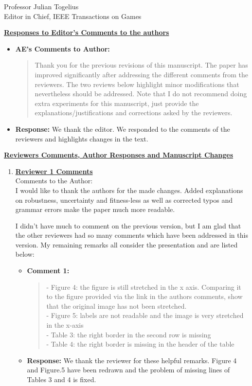 \documentclass[10pt]{letter} %
\begin{document}
\begin{letter}{Professor Julian Togelius \\ Editor in Chief, IEEE Transactions on Games}
\newpage


{\bf \underline{ Responses to Editor's  Comments to the authors}}\\
\begin{itemize}
 \item 	\bf  {\bf AE's Comments to Author:}
		\begin{quote}
Thank you for the previous revisions of this manuscript. The paper has improved significantly after addressing the different comments from the reviewers. The two reviews below highlight minor modifications that nevertheless should be addressed. Note that I do not recommend doing extra experiments for this manuscript, just provide the explanations/justifications and corrections asked by the reviewers.
		\end{quote}
 \item {\bf Response:} 
We thank the editor. We responded to the comments of the reviewers and
highlights changes in the text.

\end{itemize}
\newpage
{\bf
\underline{
 Reviewers Comments, Author Responses and Manuscript Changes}}
\begin{enumerate}

\item {\bf \underline{ Reviewer 1 Comments}}\\
		Comments to the Author:\\
	I would like to thank the authors for the made changes. Added explanations on robustness, uncertainty and fitness-less as well as corrected typos and grammar errors make the paper much more readable.
	
	I didn't have much to comment on the previous version, but I am glad that the other reviewers had so many comments which have been addressed in this version. My remaining remarks all consider the presentation and are listed below:
\begin{itemize}
	\item {\bf Comment 1:}
	\begin{quote}	
	- Figure 4: the figure is still stretched in the x axis. Comparing it to the figure provided via the link in the authors comments, show that the original image has not been stretched.\\
	- Figure 5: labels are not readable and the image is very stretched in the x-axis\\
	- Table 3: the right border in the second row is missing\\
	- Table 4: the right border is missing in the header of the table
	\end{quote}	
	\item {\bf Response:} 
		We thank the reviewer for these helpful remarks. Figure 4 and Figure.5 have been redrawn and the problem of missing lines of Tables 3 and 4 is fixed.
\end{itemize}


\end{enumerate}
\end{letter}
\end{document}
